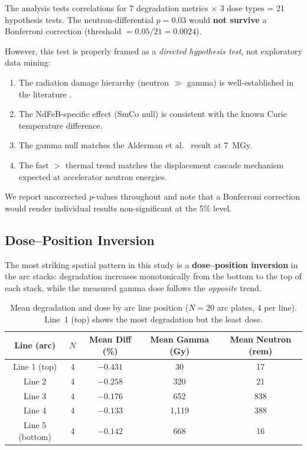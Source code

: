 \documentclass[11pt,letterpaper]{article}
\begin{document}
The analysis tests correlations for 7 degradation metrics $\times$ 3 dose
types = 21 hypothesis tests. The neutron-differential $p = 0.03$ would
\textbf{not survive} a Bonferroni correction (threshold $= 0.05/21 = 0.0024$).

However, this test is properly framed as a \textit{directed hypothesis test},
not exploratory data mining:
\begin{enumerate}
    \item The radiation damage hierarchy (neutron $\gg$ gamma) is
    well-established in the literature \cite{Shen2018,Simos2018,Bizen2016}.
    \item The NdFeB-specific effect (SmCo null) is consistent with the known
    Curie temperature difference.
    \item The gamma null matches the Alderman et al.~\cite{Alderman} result at \SI{7}{MGy}.
    \item The fast $>$ thermal trend matches the displacement cascade mechanism
    expected at accelerator neutron energies.
\end{enumerate}

We report uncorrected $p$-values throughout and note that a Bonferroni
correction would render individual results non-significant at the 5\% level.

\subsection{Dose--Position Inversion}
\label{sec:position_inversion}

The most striking spatial pattern in this study is a \textbf{dose--position
inversion} in the arc stacks: degradation increases monotonically from the
bottom to the top of each stack, while the measured gamma dose follows the
\emph{opposite} trend.

\begin{table}[H]
\centering
\caption{Mean degradation and dose by arc line position ($N = 20$ arc plates,
4 per line). Line~1 (top) shows the most degradation but the least dose.}
\label{tab:line_inversion}
\begin{tabular}{@{}ccccc@{}}
\toprule
\textbf{Line (arc)} & $N$ & \textbf{Mean Diff (\%)} &
\textbf{Mean Gamma (Gy)} & \textbf{Mean Neutron (rem)} \\
\midrule
Line 1 (top)   & 4 & $-0.431$ & 30    & 17  \\
Line 2         & 4 & $-0.258$ & 320   & 21  \\
Line 3         & 4 & $-0.176$ & 652   & 838 \\
Line 4         & 4 & $-0.133$ & 1,119 & 388 \\
Line 5 (bottom)& 4 & $-0.142$ & 668   & 16  \\
\bottomrule
\end{tabular}
\end{table}
\end{document}

